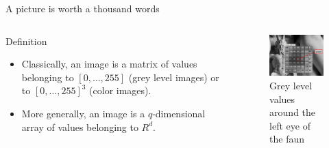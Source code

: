 \documentclass[xcolor=pdftex,dvipsnames,table,mathserif]{beamer}
\begin{document}
\begin{frame}{A picture is worth a thousand words}

  \begin{columns}
    \begin{column}{.5\textwidth}
      \begin{block}{Definition}
        \begin{itemize}
        \item Classically, an image is a matrix of values belonging to $[0, \ldots, 255]$ (grey level images) or to $[0, \ldots, 255]^3$ (color images).
        \item More generally, an image is a $q$-dimensional array of values belonging to $R^d$.
        \end{itemize}
      \end{block}

    \end{column}

    \begin{column}{.5\textwidth}
      \begin{figure}
        \centering
        \includegraphics[width=5cm]{../graphics/faune.png}\\
        \tiny{Grey level values around the left eye of the faun}
      \end{figure}

    \end{column}
  \end{columns}

\end{frame}
\end{document}
